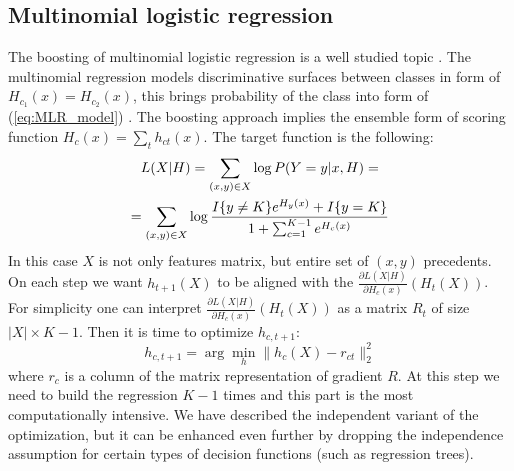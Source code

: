 \documentclass{article}
\begin{document}
\subsection{Multinomial logistic regression}
The boosting of multinomial logistic regression is a well studied topic \cite{Friedman98additivelogistic}. The multinomial regression models discriminative surfaces between classes in form of $H_{c_1}(x)=H_{c_2}(x)$, this brings probability of the class into form of (\ref{eq:MLR_model}) \cite{GLM}. The boosting approach implies the ensemble form of scoring function $H_c(x) = \sum_t h_{ct}(x)$. The target function is the following:
\begin{multline*}
	L(X\arrowvert H) = \sum_{(x,y) \in X} \log P(Y = y \arrowvert x, H) = \\
	= \sum_{(x,y) \in X} \log \frac{ I\{y \ne K \}e^{H_y(x)} + I\{y=K\} }{ 1+\sum_{c=1}^{K-1} e^{H_c(x)} }
\end{multline*}
In this case $X$ is not only features matrix, but entire set of $(x, y)$ precedents. On each step we want $h_{t + 1}(X)$ to be aligned with the $\frac{\partial L(X|H)}{\partial H_c(x)}(H_t(X))$. For simplicity one can interpret $\frac{\partial L(X|H)}{\partial H_c(x)}(H_t(X))$ as a matrix $R_t$ of size $|X|\times K-1$. Then it is time to optimize $h_{c,t+1}$:
\begin{equation}
h_{c,t+1} = \arg \min_h \|h_c(X) - r_{ct}\|_2^2
\label{eq:MLR_boosting_step}
\end{equation}
where $r_c$ is a column of the matrix representation of gradient $R$. At this step we need to build the regression $K-1$ times and this part is the most computationally intensive. We have described the independent variant of the optimization, but it can be enhanced even further by dropping the independence assumption for certain types of decision functions (such as regression trees).
\end{document}
